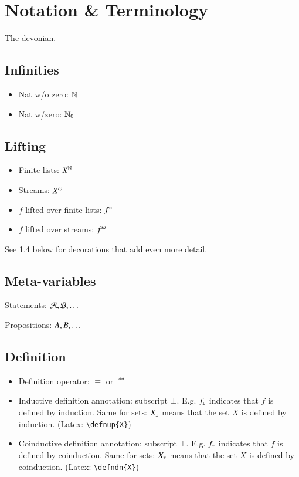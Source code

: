 \section{Notation \& Terminology}\label{appendix:notation}

The \gls{devonian}.

\subsection{Infinities}

\begin{itemize}
\item Nat w/o zero: \(\mathbb{N}\)
\item Nat w/zero: \(\mathbb{N}_0\)
\end{itemize}

\subsection{Lifting}

\begin{itemize}
\item Finite lists: \(X^{\mathbb{N}}\)
\item Streams: \(X^{\omega}\)
\item \(f\) lifted over finite lists: \(f^{\scriptscriptstyle\mathbb{N}}\)
\item \(f\) lifted over streams: \(f^{\omega}\)
\end{itemize}

See \ref{notation:definition} below for decorations that add even more
detail.


\subsection{Meta-variables}

Statements: \(\mathcal{A}, \mathcal{B}, \ldots\)

Propositions: \(A, B, \ldots\)


\subsection{Definition}\label{notation:definition}

\begin{itemize}
\item Definition operator: \(\equiv\) or \(\eqdef\)
\item Inductive definition annotation: subscript
  \(\bot\). E.g. \(f_{\scriptscriptstyle\bot}\) indicates that
  \(f\) is defined by induction. Same for sets: \(X_{\scriptscriptstyle\bot}\) means
  that the set \(X\) is defined by induction. (Latex:
  \texttt{\textbackslash{}defnup\{X\}})
\item Coinductive definition annotation: subscript \(\top\). E.g.
  \(f_{\scriptscriptstyle\top}\) indicates that \(f\) is defined by coinduction. Same
  for sets: \(X_{\scriptscriptstyle\top}\) means that the set \(X\) is defined by
  coinduction. (Latex: \texttt{\textbackslash{}defndn\{X\}})
\end{itemize}

